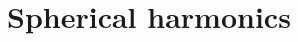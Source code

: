 \documentclass[modern]{aastex61}
\begin{document}
\pagebreak
\appendix


\section{Spherical harmonics}
\label{app:spharm}
\end{document}
